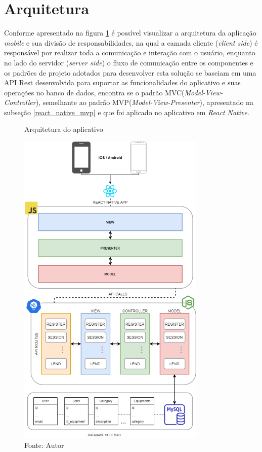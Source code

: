     \section{Arquitetura}
    
    Conforme apresentado na figura \ref{figura:lab-architecture} é possível visualizar a arquitetura da aplicação \textit{mobile} e sua divisão de responsabilidades, na qual a camada cliente (\textit{client side}) é responsável por realizar toda a comunicação e interação com o usuário, enquanto no lado do servidor (\textit{server side}) o fluxo de comunicação entre os componentes e os padrões de projeto adotados para desenvolver esta solução se baseiam em uma API Rest desenvolvida para suportar as funcionalidades do aplicativo e suas operações no banco de dados, encontra se o padrão MVC(\textit{Model-View-Controller}), semelhante ao padrão MVP(\textit{Model-View-Presenter}), apresentado na subseção \ref{react_native_mvp} e que foi aplicado no aplicativo em \textit{React Native}.
    
    \begin{figure}[h]
    \caption{Arquitetura do aplicativo}
    \centering %
    \includegraphics[width=9cm]{imagem/jubilant-octo-lab.png}
    \caption*{Fonte: Autor}
    \label{figura:lab-architecture}
    \end{figure}
    
